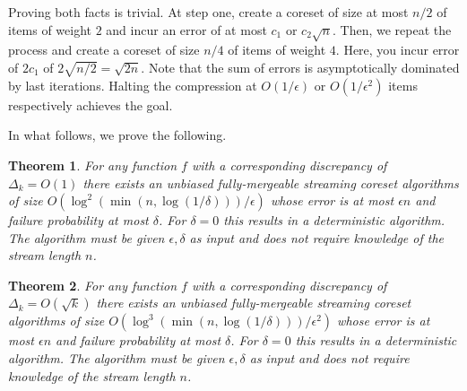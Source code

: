 \documentclass{article} %
\newtheorem{theorem}{Theorem}[section]
\newtheorem{fact}[theorem]{Fact}
\newcommand{\eps}{\epsilon}
\begin{document}
\noindent Proving both facts is trivial. 
At step one, create a coreset of size at most $n/2$ of items of weight $2$ and incur an error of at most $c_1$ or $c_2 \sqrt{n}$.
Then, we repeat the process and create a coreset of size $n/4$ of items of weight $4$. Here, you incur error of $2c_1$ of $2\sqrt{n/2}  = \sqrt{2n}$.
Note that the sum of errors is asymptotically dominated by last iterations. 
Halting the compression at $O(1/\eps)$ or $O(1/\eps^2)$ items respectively achieves the goal.
 
In what follows, we prove the following.
\begin{theorem} \label{thm:streaming}
For any function $f$ with a corresponding discrepancy of $\Delta_k = O(1)$ there exists an unbiased fully-mergeable streaming coreset algorithms of size 
$O\left(\log^2\left(\min(n, \log(1/\delta)) \right)/\eps\right)$ whose error is at most $\eps n$ and failure probability at most $\delta$. For $\delta=0$ this results in a deterministic algorithm. The algorithm must be given $\eps, \delta$ as input and does not require knowledge of the stream length $n$.
\end{theorem}


\begin{theorem}
For any function $f$ with a corresponding discrepancy of $\Delta_k = O(\sqrt{k})$ there exists an unbiased fully-mergeable streaming coreset algorithms of size 
$O\left(\log^3\left(\min(n, \log(1/\delta)) \right)/\eps^2\right)$ whose error is at most $\eps n$ and failure probability at most $\delta$. For $\delta=0$ this results in a deterministic algorithm. The algorithm must be given $\eps, \delta$ as input and does not require knowledge of the stream length $n$.
\end{theorem}
%
%
\end{document}
